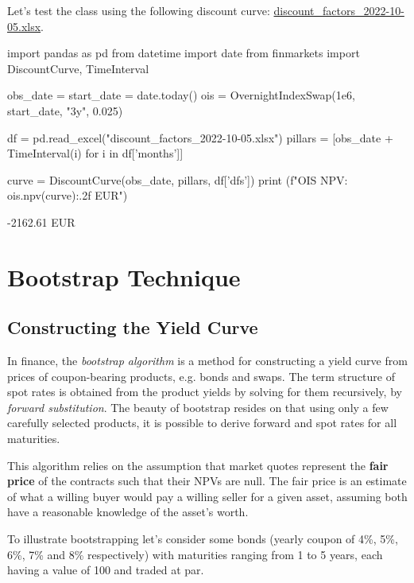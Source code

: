 Let's test the class using the following discount curve: \href{https://github.com/matteosan1/finance_course/raw/master/input_files/discount_factors_2022-10-05.xlsx}{discount\_factors\_2022-10-05.xlsx}.

\begin{ipython}
import pandas as pd
from datetime import date
from finmarkets import DiscountCurve, TimeInterval

obs_date = start_date = date.today()
ois = OvernightIndexSwap(1e6, start_date, "3y", 0.025)

df = pd.read_excel("discount_factors_2022-10-05.xlsx")
pillars = [obs_date + TimeInterval(i) for i in df['months']]

curve = DiscountCurve(obs_date, pillars, df['dfs'])
print (f"OIS NPV: {ois.npv(curve):.2f} EUR")
\end{ipython}
\begin{ioutput}
-2162.61 EUR
\end{ioutput}

\section{Bootstrap Technique}
\label{bootstrapping-technique}

\subsection{Constructing the Yield Curve}
\label{the-bootstrapping-technique}

In finance, the \emph{bootstrap algorithm} is a method for constructing a yield curve from prices of coupon-bearing products, e.g. bonds and swaps. The term structure of spot rates is obtained from the product yields by solving for them recursively, by \emph{forward substitution}. 
The beauty of bootstrap resides on that using only a few carefully selected products, it is possible to derive forward and spot rates for all maturities.

This algorithm relies on the assumption that market quotes represent the \textbf{fair price} of the contracts such that their NPVs are null. The fair price is an estimate of what a willing buyer would pay a willing seller for a given asset, assuming both have a reasonable knowledge of the asset's worth.

To illustrate bootstrapping let's consider some bonds (yearly coupon of 4\%, 5\%, 6\%, 7\% and 8\% respectively) with maturities ranging from 1 to 5 years, each having a value of 100 and traded at par. 

